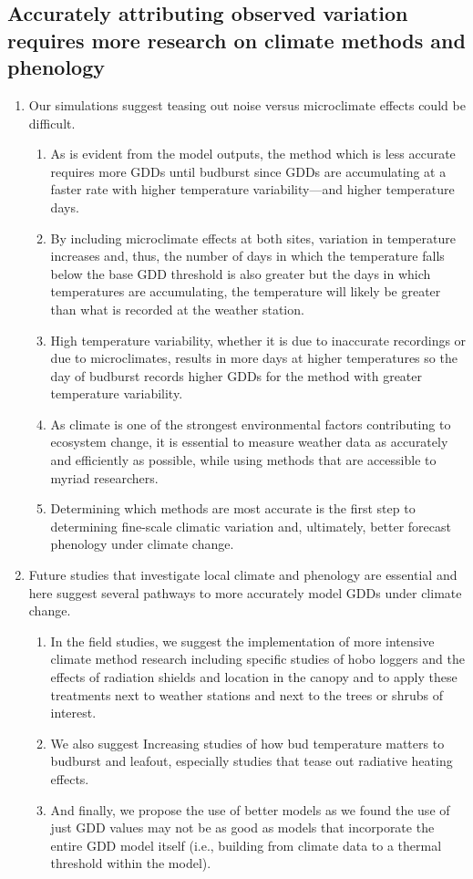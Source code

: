 \documentclass{article}\usepackage[]{graphicx}\usepackage[]{color}
\begin{document}
\begin{enumerate}
\subsection*{Accurately attributing observed variation requires more research on climate methods and phenology} 
  \begin{enumerate} 
\item Our simulations suggest teasing out noise versus microclimate effects could be difficult.
  \begin{enumerate} 
  \item As is evident from the model outputs, the method which is less accurate requires more GDDs until budburst since GDDs are accumulating at a faster rate with higher temperature variability---and higher temperature days.
  \item By including microclimate effects at both sites, variation in temperature increases and, thus, the number of days in which the temperature falls below the base GDD threshold is also greater but the days in which temperatures are accumulating, the temperature will likely be greater than what is recorded at the weather station.
  \item High temperature variability, whether it is due to inaccurate recordings or due to microclimates, results in more days at higher temperatures so the day of budburst records higher GDDs for the method with greater temperature variability. 
  \item As climate is one of the strongest environmental factors contributing to ecosystem change, it is essential to measure weather data as accurately and efficiently as possible, while using methods that are accessible to myriad researchers.
  \item Determining which methods are most accurate is the first step to determining fine-scale climatic variation and, ultimately, better forecast phenology under climate change. 
  \end{enumerate}
  
\item Future studies that investigate local climate and phenology are essential and here suggest several pathways to more accurately model GDDs under climate change.
    \begin{enumerate} 
    \item In the field studies, we suggest the implementation of more intensive climate method research including specific studies of hobo loggers and the effects of radiation shields and location in the canopy and to apply these treatments next to weather stations and next to the trees or shrubs of interest. 
    \item We also suggest Increasing studies of how bud temperature matters to budburst and leafout, especially studies that tease out radiative heating effects.
    \item And finally, we propose the use of better models as we found the use of just GDD values may not be as good as models that incorporate the entire GDD model itself (i.e., building from climate data to a thermal threshold within the model).
  \end{enumerate}
  

\end{enumerate}
\end{enumerate}
\end{document}
